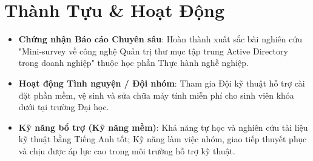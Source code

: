 \documentclass[letterpaper,11pt]{article}
\newcommand{\resumeSubHeadingListStart}{\begin{itemize}[leftmargin=*]}
\newcommand{\resumeSubHeadingListEnd}{\end{itemize}}
\begin{document}
\section{Thành Tựu \& Hoạt Động}
  \resumeSubHeadingListStart
    \item{
      \textbf{Chứng nhận Báo cáo Chuyên sâu}{: Hoàn thành xuất sắc bài nghiên cứu "Mini-survey về công nghệ Quản trị thư mục tập trung Active Directory trong doanh nghiệp" thuộc học phần Thực hành nghề nghiệp.}
    }
    \vspace{-5pt}
    \item{
      \textbf{Hoạt động Tình nguyện / Đội nhóm}{: Tham gia Đội kỹ thuật hỗ trợ cài đặt phần mềm, vệ sinh và sửa chữa máy tính miễn phí cho sinh viên khóa dưới tại trường Đại học.}
    }
    \vspace{-5pt}
    \item{
      \textbf{Kỹ năng bổ trợ (Kỹ năng mềm)}{: Khả năng tự học và nghiên cứu tài liệu kỹ thuật bằng Tiếng Anh tốt; Kỹ năng làm việc nhóm, giao tiếp thuyết phục và chịu được áp lực cao trong môi trường hỗ trợ kỹ thuật.}
    }
  \resumeSubHeadingListEnd

\end{document}

